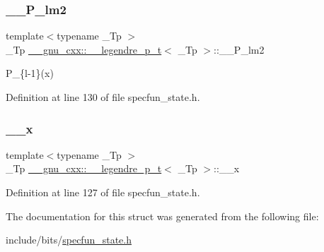 \mbox{\label{struct____gnu__cxx_1_1____legendre__p__t_a9090dfe57d4b5993828510fd0202c888}} 
\subsubsection{\texorpdfstring{\+\_\+\+\_\+\+P\+\_\+lm2}{\_\_P\_lm2}}
{\footnotesize\ttfamily template$<$typename \+\_\+\+Tp $>$ \\
\+\_\+\+Tp \hyperlink{struct____gnu__cxx_1_1____legendre__p__t}{\+\_\+\+\_\+gnu\+\_\+cxx\+::\+\_\+\+\_\+legendre\+\_\+p\+\_\+t}$<$ \+\_\+\+Tp $>$\+::\+\_\+\+\_\+\+P\+\_\+lm2}



P\+\_\+\{l-\/1\}(x) 



Definition at line 130 of file specfun\+\_\+state.\+h.

\mbox{\label{struct____gnu__cxx_1_1____legendre__p__t_ab71bc6febb6c33ca7be6beb0f30edd83}} 
\subsubsection{\texorpdfstring{\+\_\+\+\_\+x}{\_\_x}}
{\footnotesize\ttfamily template$<$typename \+\_\+\+Tp $>$ \\
\+\_\+\+Tp \hyperlink{struct____gnu__cxx_1_1____legendre__p__t}{\+\_\+\+\_\+gnu\+\_\+cxx\+::\+\_\+\+\_\+legendre\+\_\+p\+\_\+t}$<$ \+\_\+\+Tp $>$\+::\+\_\+\+\_\+x}



Definition at line 127 of file specfun\+\_\+state.\+h.



The documentation for this struct was generated from the following file\+:\begin{DoxyCompactItemize}
\item 
include/bits/\hyperlink{specfun__state_8h}{specfun\+\_\+state.\+h}\end{DoxyCompactItemize}
